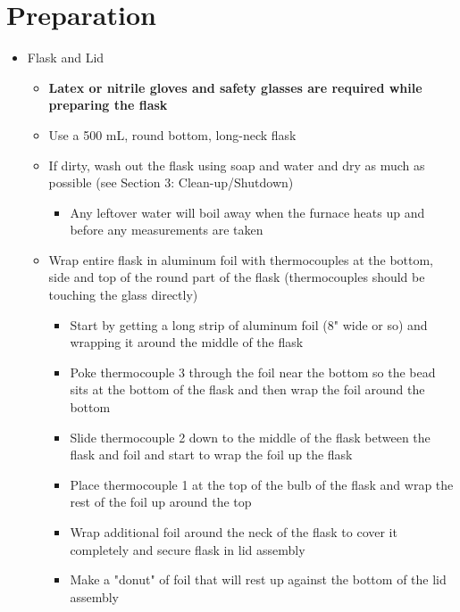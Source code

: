 \documentclass[letterpaper,11pt]{article}
\begin{document}
\section{Preparation}
    \begin{itemize}
    \item Flask and Lid
        
        \begin{itemize}
        \item \textbf{Latex or nitrile gloves and safety glasses are 
            required while preparing the flask}
        \item Use a 500 mL, round bottom, long-neck flask
        \item If dirty, wash out the flask using soap and water and dry as much 
            as possible (see Section 3: Clean-up/Shutdown)
            
                \begin{itemize}
                \item Any leftover water will boil away when the furnace heats 
                up and before any measurements are taken
                \end{itemize}
                
        \item Wrap entire flask in aluminum foil with thermocouples at the 
            bottom, side and top of the round part of the flask (thermocouples 
            should be touching the glass directly) %
            
                \begin{itemize}
                \item Start by getting a long strip of aluminum foil (8" wide or 
                    so) and wrapping it around the middle of the flask
                \item Poke thermocouple 3 through the foil near the bottom so 
                    the bead sits at the bottom of the flask and then wrap the 
                    foil around the bottom
                \item Slide thermocouple 2 down to the middle of the flask 
                    between the flask and foil and start to wrap the foil up 
                    the flask
                \item Place thermocouple 1 at the top of the bulb of the flask 
                    and wrap the rest of the foil up around the top
                \item Wrap additional foil around the neck of the flask to cover 
                    it completely and secure flask in lid assembly
                \item Make a "donut" of foil that will rest up against the 
                bottom of the lid assembly
                \end{itemize}
                

\end{itemize}
\end{itemize}
\end{document}
